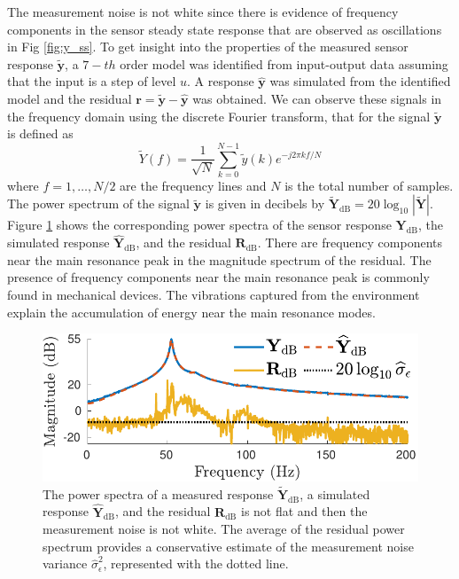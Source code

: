 The measurement noise is not white since there is evidence of frequency components in the sensor steady state response that are observed as oscillations in Fig \ref{fig:y_ss}.
To get insight into the properties of the measured sensor response $\widetilde{\mathbf{y}}$, a $\mathrm{7-}th$ order model was identified from input-output data assuming that the input is a step of level $u$.
A response $\widehat{\mathbf{y}}$ was simulated from the identified model and the residual $\mathbf{r} = \widetilde{\mathbf{y}} - \widehat{\mathbf{y}}$ was obtained. 
We can observe these signals in the frequency domain using the discrete Fourier transform, that for the signal $\widetilde{\mathbf{y}}$ is defined as 
\begin{equation} \widetilde{Y}(f) = \dfrac{1}{\sqrt{N}} \sum_{k=0}^{N-1} \widetilde{y} \left( k \right) e^{-j2\pi k f / N} \label{eqn:FFT} \end{equation}
where $f = 1, \ldots, N/2$ are the frequency lines and $N$ is the total number of samples.
The power spectrum of the signal $\widetilde{\mathbf{y}}$ is given in decibels by $\widetilde{\mathbf{Y}}_\mathrm{dB} = 20 \log_{10}{ |\widetilde{\mathbf{Y}}| } $.
Figure \ref{fig:YYhR_n7} shows the corresponding power spectra of the sensor response $\mathbf{Y}_\mathrm{dB}$, the simulated response $\widehat{\mathbf{Y}}_\mathrm{dB}$, and the residual $\mathbf{R}_\mathrm{dB}$. 
There are frequency components near the main resonance peak in the magnitude spectrum of the residual.
The presence of frequency components near the main resonance peak is commonly found in mechanical devices.
The vibrations captured from the environment explain the accumulation of energy near the main resonance modes.

\begin{figure}[!htb]
\centering
\includegraphics[width=1.0\columnwidth]{./ChapterExperimentalValidation/fig/Fig_9.pdf}
\caption{ \label{fig:YYhR_n7} 
The power spectra of a measured response $\widetilde{\mathbf{Y}}_\mathrm{dB}$, a simulated response $\widehat{\mathbf{Y}}_\mathrm{dB}$, and the residual $\mathbf{R}_\mathrm{dB}$ is not flat and then the measurement noise is not white. 
The average of the residual power spectrum provides a conservative estimate of the measurement noise variance $\widehat{\sigma}_\epsilon^2$, represented with the dotted line.}
\end{figure}

